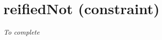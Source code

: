 \section{reifiedNot (constraint)}\label{reifiednot:reifiednotconstraint}\hypertarget{reifiednot:reifiednotconstraint}{}
\emph{To complete}
